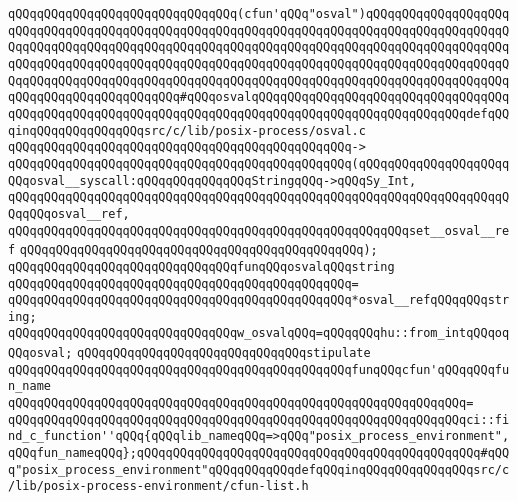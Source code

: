 \newline
\newline
\newline
\verb|qQQqqQQqqQQqqQQqqQQqqQQqqQQqqQQq(cfun'qQQq"osval")qQQqqQQqqQQqqQQqqQQqqQQqqQQqqQQqqQQqqQQqqQQqqQQqqQQqqQQqqQQqqQQqqQQqqQQqqQQqqQQqqQQqqQQqqQQqqQQqqQQqqQQqqQQqqQQqqQQqqQQqqQQqqQQqqQQqqQQqqQQqqQQqqQQqqQQqqQQqqQQqqQQqqQQqqQQqqQQqqQQqqQQqqQQqqQQqqQQqqQQqqQQqqQQqqQQqqQQqqQQqqQQqqQQqqQQqqQQqqQQqqQQqqQQqqQQqqQQqqQQqqQQqqQQqqQQqqQQqqQQqqQQqqQQqqQQqqQQqqQQqqQQqqQQqqQQqqQQqqQQqqQQq#qQQqosvalqQQqqQQqqQQqqQQqqQQqqQQqqQQqqQQqqQQqqQQqqQQqqQQqqQQqqQQqqQQqqQQqqQQqqQQqqQQqqQQqqQQqqQQqqQQqqQQqqQQqdefqQQqinqQQqqQQqqQQqqQQqsrc/c/lib/posix-process/osval.c|\newline
\verb|qQQqqQQqqQQqqQQqqQQqqQQqqQQqqQQqqQQqqQQqqQQqqQQq->|\newline
\verb|qQQqqQQqqQQqqQQqqQQqqQQqqQQqqQQqqQQqqQQqqQQqqQQq(qQQqqQQqqQQqqQQqqQQqqQQqosval__syscall:qQQqqQQqqQQqqQQqStringqQQq->qQQqSy_Int,|\newline
\verb|qQQqqQQqqQQqqQQqqQQqqQQqqQQqqQQqqQQqqQQqqQQqqQQqqQQqqQQqqQQqqQQqqQQqqQQqqQQqosval__ref,|\newline
\verb|qQQqqQQqqQQqqQQqqQQqqQQqqQQqqQQqqQQqqQQqqQQqqQQqqQQqqQQqset__osval__ref|\newline
\verb|qQQqqQQqqQQqqQQqqQQqqQQqqQQqqQQqqQQqqQQqqQQqqQQq);|\newline
\newline
\verb|qQQqqQQqqQQqqQQqqQQqqQQqqQQqqQQqfunqQQqosvalqQQqstring|\newline
\verb|qQQqqQQqqQQqqQQqqQQqqQQqqQQqqQQqqQQqqQQqqQQqqQQq=|\newline
\verb|qQQqqQQqqQQqqQQqqQQqqQQqqQQqqQQqqQQqqQQqqQQqqQQq*osval__refqQQqqQQqstring;|\newline
\newline
\newline
\newline
\verb|qQQqqQQqqQQqqQQqqQQqqQQqqQQqqQQqw_osvalqQQq=qQQqqQQqhu::from_intqQQqoqQQqosval;|\newline
\newline
\newline
\verb|qQQqqQQqqQQqqQQqqQQqqQQqqQQqqQQqstipulate|\newline
\verb|qQQqqQQqqQQqqQQqqQQqqQQqqQQqqQQqqQQqqQQqqQQqqQQqfunqQQqcfun'qQQqqQQqfun_name|\newline
\verb|qQQqqQQqqQQqqQQqqQQqqQQqqQQqqQQqqQQqqQQqqQQqqQQqqQQqqQQqqQQqqQQq=|\newline
\verb|qQQqqQQqqQQqqQQqqQQqqQQqqQQqqQQqqQQqqQQqqQQqqQQqqQQqqQQqqQQqqQQqci::find_c_function''qQQq{qQQqlib_nameqQQq=>qQQq"posix_process_environment",qQQqfun_nameqQQq};qQQqqQQqqQQqqQQqqQQqqQQqqQQqqQQqqQQqqQQqqQQqqQQq#qQQq"posix_process_environment"qQQqqQQqqQQqdefqQQqinqQQqqQQqqQQqqQQqsrc/c/lib/posix-process-environment/cfun-list.h|\newline
